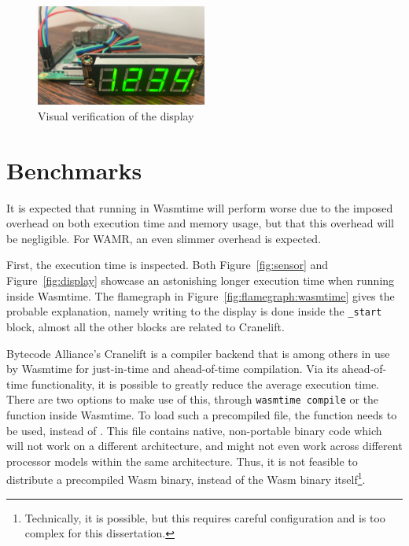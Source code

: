 \begin{figure}[h]
  \centering
  \includegraphics[width=0.5\textwidth]{figures/verification}
  \caption{Visual verification of the display}
  \label{fig:verif}
\end{figure}



\section{Benchmarks}

It is expected that running in Wasmtime will perform worse due to the imposed overhead on both execution time and memory usage, but that this overhead will be negligible. For WAMR, an even slimmer overhead is expected.

First, the execution time is inspected.
Both Figure~\ref{fig:sensor} and Figure~\ref{fig:display} showcase an astonishing longer execution time when running inside Wasmtime. The flamegraph in Figure~\ref{fig:flamegraph:wasmtime} gives the probable explanation, namely writing to the display is done inside the \texttt{\_start} block, almost all the other blocks are related to Cranelift.

Bytecode Alliance's Cranelift is a compiler backend that is among others in use by Wasmtime for just-in-time and ahead-of-time compilation. Via its ahead-of-time functionality, it is possible to greatly reduce the average execution time. There are two options to make use of this, through \texttt{wasmtime compile} or the  function inside Wasmtime. To load such a precompiled file, the  function needs to be used, instead of . This file contains native, non-portable binary code which will not work on a different architecture, and might not even work across different processor models within the same architecture. Thus, it is not feasible to distribute a precompiled \gls{Wasm} binary, instead of the \gls{Wasm} binary itself\footnote{Technically, it is possible, but this requires careful configuration and is too complex for this dissertation.}.

